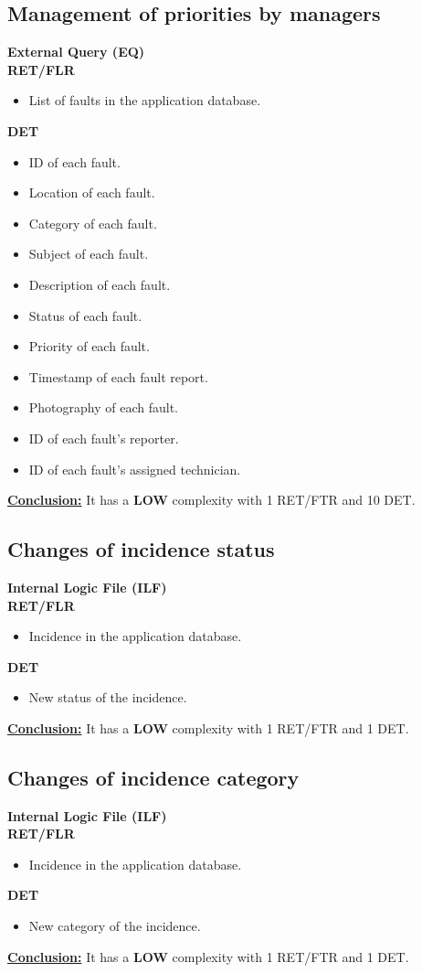 \subsection{Management of priorities by managers}
\textbf{External Query (EQ)} \\ 
\textbf{RET/FLR}
\begin{itemize}
\item List of faults in the application database.
\end{itemize}
\textbf{DET}
\begin{itemize}
\item ID of each fault.
\item Location of each fault.
\item Category of each fault.
\item Subject of each fault.
\item Description of each fault.
\item Status of each fault.
\item Priority of each fault.
\item Timestamp of each fault report.
\item Photography of each fault.
\item ID of each fault's reporter.
\item ID of each fault's assigned technician.
\end{itemize}
\textbf{\underline{Conclusion:}} It has a \textbf{LOW} complexity with 1 RET/FTR and 10 DET.

\subsection{Changes of incidence status}
\textbf{Internal Logic File (ILF)} \\ 
\textbf{RET/FLR}
\begin{itemize}
\item Incidence in the application database.
\end{itemize}
\textbf{DET}
\begin{itemize}
\item New status of the incidence.
\end{itemize}
\textbf{\underline{Conclusion:}} It has a \textbf{LOW} complexity with 1 RET/FTR and 1 DET.

\subsection{Changes of incidence category}
\textbf{Internal Logic File (ILF)} \\ 
\textbf{RET/FLR}
\begin{itemize}
\item Incidence in the application database.
\end{itemize}
\textbf{DET}
\begin{itemize}
\item New category of the incidence.
\end{itemize}
\textbf{\underline{Conclusion:}} It has a \textbf{LOW} complexity with 1 RET/FTR and 1 DET.

